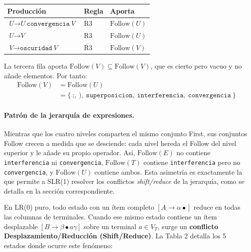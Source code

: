\documentclass[12pt, letterpaper]{article}
\newcommand{\nt}[1]{\textit{#1}}          %
\newcommand{\tl}[1]{\texttt{#1}}          %
\newcommand{\der}{\ensuremath{\rightarrow}}
\begin{document}
\begin{center}
\begin{tabular}{l l l}
\toprule
Producción & Regla & Aporta \\
\midrule
$\nt{U} \der \nt{U}\ \tl{convergencia}\ \nt{V}$ & R3 & $\mathrm{Follow}(U)$ \\
$\nt{U} \der \nt{V}$ & R3 & $\mathrm{Follow}(U)$ \\
$\nt{V} \der \tl{oscuridad}\ \nt{V}$ & R3 & $\mathrm{Follow}(V)$ \\
\bottomrule
\end{tabular}
\end{center}

La tercera fila aporta $\mathrm{Follow}(V) \subseteq \mathrm{Follow}(V)$,
que es cierto pero vacuo y no añade elementos. Por tanto:
\begin{align*}
  \mathrm{Follow}(V) &= \mathrm{Follow}(U) \\
  &= \{\ \tl{;},\ \tl{)},\ \tl{superposicion},\ \tl{interferencia},\ \tl{convergencia}\ \}
\end{align*}

\paragraph{Patrón de la jerarquía de expresiones.} Mientras que los cuatro
niveles comparten el mismo conjunto First, sus conjuntos Follow crecen a
medida que se desciende: cada nivel hereda el Follow del nivel superior y
le añade su propio operador. Así, $\mathrm{Follow}(E)$ no contiene
\tl{interferencia} ni \tl{convergencia}, $\mathrm{Follow}(T)$ contiene
\tl{interferencia} pero no \tl{convergencia}, y $\mathrm{Follow}(U)$
contiene ambos. Esta asimetría es exactamente la que permite a SLR(1)
resolver los conflictos \emph{shift/reduce} de la jerarquía, como se
detalla en la sección correspondiente.

En LR(0) puro, todo estado con un ítem completo $[A \to \alpha \bullet]$ reduce en todas las columnas de terminales. Cuando ese mismo estado contiene un ítem desplazable $[B \to \beta \bullet a \gamma]$ sobre un terminal $a \in V_T$, surge un \textbf{conflicto Desplazamiento/Reducción (Shift/Reduce)}. La Tabla 2 detalla los 5 estados donde ocurre este fenómeno:
\end{document}
